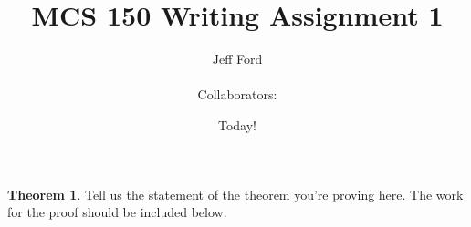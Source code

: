 \documentclass[12 pt]{article}
\theoremstyle{definition}
\newtheorem*{thm}{Theorem}
\begin{document}
 
 
\title{MCS 150 Writing Assignment 1}%
\author{Jeff Ford\\ %
\\ %
Collaborators: } %
\date{Today!} %
 
\maketitle

\begin{thm}
Tell us the statement of the theorem you're proving here. The work for the proof should be included below.
\end{thm}
\end{document}
